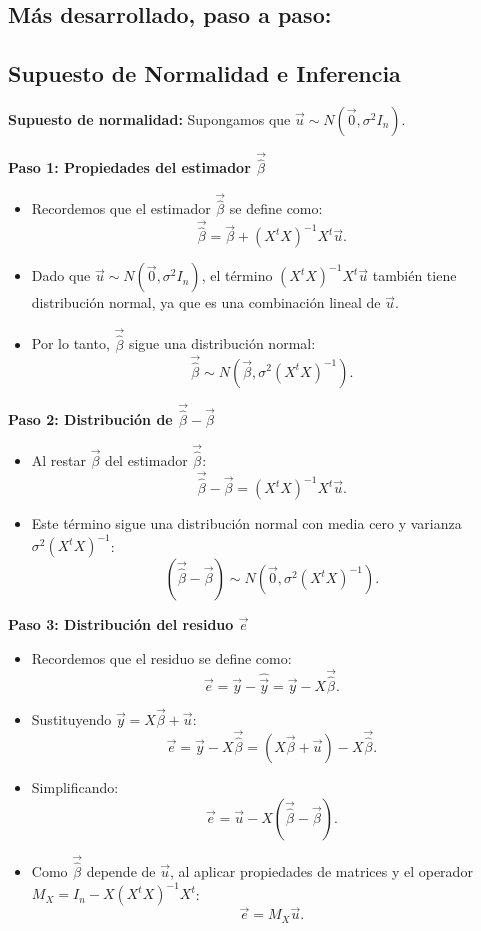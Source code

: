 \documentclass[a4paper,12pt]{article}
\begin{document}
\subsection*{Más desarrollado, paso a paso:}

\subsection{Supuesto de Normalidad e Inferencia}

\textbf{Supuesto de normalidad:} Supongamos que \( \vec{u} \sim N(\vec{0}, \sigma^2 I_n) \).

\textbf{Paso 1: Propiedades del estimador \( \vec{\hat{\beta}} \)} 
\begin{itemize}
    \item Recordemos que el estimador \( \vec{\hat{\beta}} \) se define como:
    \[
    \vec{\hat{\beta}} = \vec{\beta} + (X^t X)^{-1} X^t \vec{u}.
    \]
    \item Dado que \( \vec{u} \sim N(\vec{0}, \sigma^2 I_n) \), el término \( (X^t X)^{-1} X^t \vec{u} \) también tiene distribución normal, ya que es una combinación lineal de \( \vec{u} \).
    \item Por lo tanto, \( \vec{\hat{\beta}} \) sigue una distribución normal:
    \[
    \vec{\hat{\beta}} \sim N(\vec{\beta}, \sigma^2 (X^t X)^{-1}).
    \]
\end{itemize}

\textbf{Paso 2: Distribución de \( \vec{\hat{\beta}} - \vec{\beta} \)}
\begin{itemize}
    \item Al restar \( \vec{\beta} \) del estimador \( \vec{\hat{\beta}} \):
    \[
    \vec{\hat{\beta}} - \vec{\beta} = (X^t X)^{-1} X^t \vec{u}.
    \]
    \item Este término sigue una distribución normal con media cero y varianza \( \sigma^2 (X^t X)^{-1} \):
    \[
    (\vec{\hat{\beta}} - \vec{\beta}) \sim N(\vec{0}, \sigma^2 (X^t X)^{-1}).
    \]
\end{itemize}

\textbf{Paso 3: Distribución del residuo \( \vec{e} \)}
\begin{itemize}
    \item Recordemos que el residuo se define como:
    \[
    \vec{e} = \vec{y} - \hat{\vec{y}} = \vec{y} - X \vec{\hat{\beta}}.
    \]
    \item Sustituyendo \( \vec{y} = X \vec{\beta} + \vec{u} \):
    \[
    \vec{e} = \vec{y} - X \vec{\hat{\beta}} = (X \vec{\beta} + \vec{u}) - X \vec{\hat{\beta}}.
    \]
    \item Simplificando:
    \[
    \vec{e} = \vec{u} - X (\vec{\hat{\beta}} - \vec{\beta}).
    \]
    \item Como \( \vec{\hat{\beta}} \) depende de \( \vec{u} \), al aplicar propiedades de matrices y el operador \( M_X = I_n - X (X^t X)^{-1} X^t \):
    \[
    \vec{e} = M_X \vec{u}.
    \]
\end{itemize}
\end{document}
